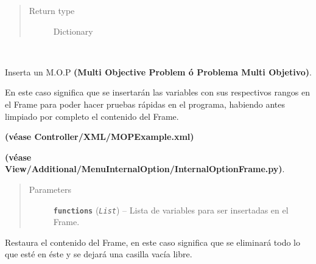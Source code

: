 \documentclass[letterpaper,10pt,english]{sphinxmanual}
\begin{document}
\begin{fulllineitems}
\begin{fulllineitems}
\begin{quote}
\begin{description}
\item[{Return type}] \leavevmode
Dictionary

\end{description}\end{quote}

\end{fulllineitems}


\begin{fulllineitems}
\label{View/Main/DecisionVariable/DecisionVariableFrame:View.Main.DecisionVariable.DecisionVariableFrame.DecisionVariableFrame.insert_mop_example}~
\begin{DUlineblock}{0em}
\item[] Inserta un M.O.P \textbf{(Multi Objective Problem ó Problema Multi Objetivo)}.
\item[] En este caso significa que se insertarán las variables con 
sus respectivos rangos en el Frame para poder hacer pruebas rápidas en el programa, habiendo
antes limpiado por completo el contenido del Frame.
\item[] \textbf{(véase Controller/XML/MOPExample.xml)}
\item[] \textbf{(véase View/Additional/MenuInternalOption/InternalOptionFrame.py)}.
\end{DUlineblock}
\begin{quote}\begin{description}
\item[{Parameters}] \leavevmode
\textbf{\texttt{functions}} (\emph{\texttt{List}}) -- Lista de variables para ser insertadas en el Frame.

\end{description}\end{quote}

\end{fulllineitems}


\begin{fulllineitems}
\label{View/Main/DecisionVariable/DecisionVariableFrame:View.Main.DecisionVariable.DecisionVariableFrame.DecisionVariableFrame.restore_settings}
Restaura el contenido del Frame, en este caso significa que se eliminará
todo lo que esté en éste y se dejará una casilla vacía libre.

\end{fulllineitems}


\end{fulllineitems}
\end{document}
